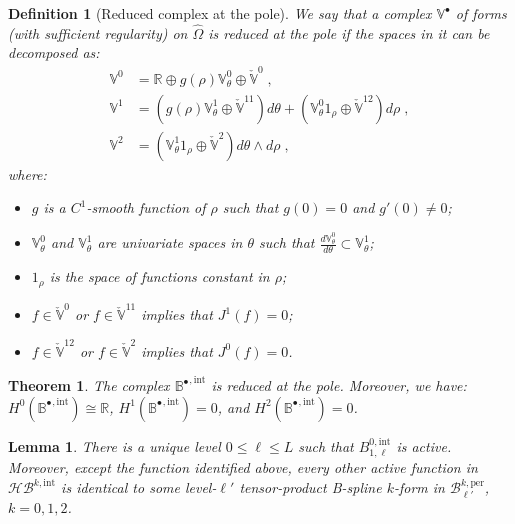 \documentclass[10pt,a4paper]{amsart}
\newtheorem{definition}{Definition}
\newtheorem{theorem}{Theorem}
\newtheorem{lemma}{Lemma}
\newcommand{\RR}{{\mathbb{R}}}
\newcommand{\basis}[1]{\mathcal{#1}}
\newcommand{\bsp}{B}
\newcommand{\bspB}{\basis{\bsp}}
\newcommand{\cU}{\theta}
\newcommand{\cV}{\rho}
\newcommand{\complex}[1]{\mathit{\vSpace{#1}^\bullet}}
\newcommand{\dcU}{\mathit{d\cU}}
\newcommand{\dcV}{\mathit{d\cV}}
\newcommand{\hBasis}[1]{\mathit{\basis{H}\basis{#1}}}
\newcommand{\isomorphic}{\cong}
\newcommand{\jet}[2]{J^{#1}\left(#2\right)}
\newcommand{\kntU}{\cU}
\newcommand{\kntV}{\cV}
\newcommand{\kntsU}{\mbf{\kntU}}
\newcommand{\kntsV}{\mbf{\kntV}}
\newcommand{\mbf}[1]{{\boldsymbol{#1}}}
\newcommand{\per}{\mathrm{per}}
\newcommand{\pkntsU}{\kntsU^\per}
\newcommand{\tint}{\mathrm{int}}
\newcommand{\tpB}[2]{\bspB^{#1}}
\newcommand{\tpDomain}{\widehat{\Omega}}
\newcommand{\vSpace}[1]{\mathbb{#1}}
\begin{document}
\begin{definition}[Reduced complex at the pole]\label{def:reduced-complex}
    We say that a complex $\complex{V}$ of forms (with sufficient regularity) on $\tpDomain$ is reduced at the pole if the spaces in it can be decomposed as:
    \begin{equation}
        \begin{split}
            \vSpace{V}^0 &= \RR \oplus g(\cV)\vSpace{V}_\cU^0 \oplus \check{\vSpace{V}}^0\;,\\
            \vSpace{V}^1 &= \left(g(\cV)\vSpace{V}_\cU^1 \oplus \check{\vSpace{V}}^{11}\right)\dcU
                            + \left(\vSpace{V}_\cU^0 1_\cV \oplus \check{\vSpace{V}}^{12}\right)\dcV\;,\\
            \vSpace{V}^2 &= \left(\vSpace{V}_\cU^1 1_\cV \oplus \check{\vSpace{V}}^2\right)\dcU \wedge \dcV\;,
        \end{split}
    \end{equation}
    where:
    \begin{itemize}
        \item $g$ is a $C^1$-smooth function of $\cV$ such that $g(0) = 0$ and $g'(0) \neq 0$;
        \item $\vSpace{V}_\cU^0$ and $\vSpace{V}_\cU^1$ are univariate spaces in $\cU$ such that $\frac{d\vSpace{V}_\cU^0}{\dcU} \subset \vSpace{V}_\cU^1$;
        \item $1_\cV$ is the space of functions constant in $\cV$;
        \item $f \in \check{\vSpace{V}}^0$ or $f \in \check{\vSpace{V}}^{11}$ implies that $\jet{1}{f} = 0$;
        \item $f \in \check{\vSpace{V}}^{12}$ or $f \in \check{\vSpace{V}}^2$ implies that $\jet{0}{f} = 0$.
    \end{itemize}
\end{definition}

\begin{theorem}\label{thm:intermediate-complex}
    The complex $\complex{\bsp}^{,\tint}$ is reduced at the pole.
    Moreover, we have:
    $H^0(\complex{{\bsp}}^{,\tint}) \isomorphic \RR$, $H^1(\complex{{\bsp}}^{,\tint}) = 0$, and $H^2(\complex{{\bsp}}^{,\tint}) = 0$.
\end{theorem}

\begin{lemma}\label{lem:active-intermediate-basis}
    There is a unique level $0 \leq \ell \leq L$ such that $\bsp^{0,\tint}_{1,\ell}$ is active.
    Moreover, except the function identified above, every other active function in $\hBasis{\bsp}^{k,\tint}$ is identical to some level-$\ell'$ tensor-product B-spline $k$-form in $\bspB^{k,\per}_{\ell'}$,
     $k = 0, 1, 2$.
\end{lemma}
\end{document}
